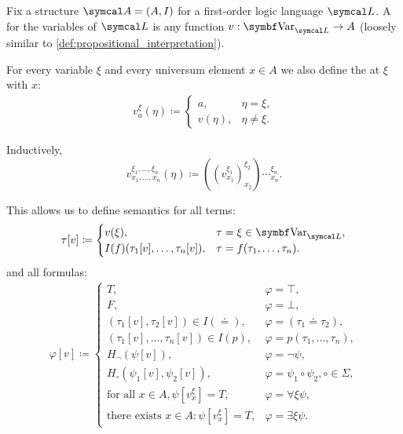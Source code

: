 \begin{definition}\label{def:first_order_variable_assignment}\cite[definition 14.32]{OpenLogic20201202}
  Fix a structure \( \Cal{A} = (A, I) \) for a first-order logic language \( \Cal{L} \). A  for the variables of \( \Cal{L} \) is any function \( v: \Cat{Var}_{\Cal{L}} \to A \) (loosely similar to \cref{def:propositional_interpretation}).

  For every variable \( \xi \) and every universum element \( x \in A \) we also define the  at \( \xi \) with \( x \):
  \begin{align*}
    v_a^\xi(\eta) \coloneqq \begin{cases}
      a,    &\eta = \xi, \\
      v(\eta), &\eta \neq \xi.
    \end{cases}
  \end{align*}

  Inductively,
  \begin{equation*}
    v_{x_1, \ldots, x_n}^{\xi_1, \ldots, \xi_n}(\eta) \coloneqq ((v_{x_1}^{\xi_1})_{x_2}^{\xi_2})\cdots_{x_n}^{\xi_n}.
  \end{equation*}

  This allows us to define semantics for all terms:
  \begin{align*}
    \tau[v] \coloneqq \begin{cases}
      v(\xi),                               &\tau = \xi \in \Cat{Var}_{\Cal{L}}, \\
      I(f)(\tau_1[v], \ldots, \tau_n[v]),   &\tau = f(\tau_1, \ldots, \tau_n).
    \end{cases}
  \end{align*}
  and all formulas:
  \begin{align*}
    \varphi[v] \coloneqq \begin{cases}
      T,                                                &\varphi = \top, \\
      F,                                                &\varphi = \bot, \\
      (\tau_1[v], \tau_2[v]) \in I(\doteq),             &\varphi = (\tau_1 \doteq \tau_2), \\
      (\tau_1[v], \ldots, \tau_n[v]) \in I(p),          &\varphi = p(\tau_1, \ldots, \tau_n), \\
      H_\neg(\psi[v]),                                  &\varphi = \neg \psi, \\
      H_\circ(\psi_1[v], \psi_2[v]),                    &\varphi = \psi_1 \circ \psi_2, \circ \in \Sigma, \\
      \text{for all } x \in A, \psi[v_x^\xi] = T,       &\varphi = \forall \xi \psi, \\
      \text{there exists } x \in A: \psi[v_x^\xi] = T,  &\varphi = \exists \xi \psi.
    \end{cases}
  \end{align*}


\end{definition}
